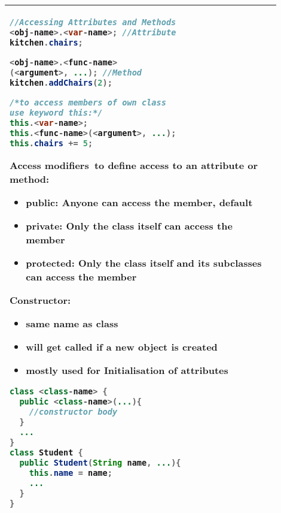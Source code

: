 \documentclass[a4paper, 8pt]{extarticle}
\begin{document}
\begin{minipage}[t]{0.25\linewidth}
\begin{tabular}{|p{0.9\linewidth}|}
\begin{lstlisting}[language=Java, aboveskip=0pt,belowskip=-6pt]
//Accessing Attributes and Methods
<obj-name>.<var-name>; //Attribute
kitchen.chairs;

<obj-name>.<func-name>
(<argument>, ...); //Method
kitchen.addChairs(2);

/*to access members of own class 
use keyword this:*/
this.<var-name>;
this.<func-name>(<argument>, ...);
this.chairs += 5;

\end{lstlisting}
\vspace{7pt}
\fontsize{8}{5}\selectfont
\begin{minipage}[l]{1\linewidth}
\vspace{7pt}
Access modifiers\small \ to define access to an attribute
or method:\begin{itemize}
\setlength{\itemindent}{-17pt}
\item public: Anyone can access the member, default
\item private: Only the class itself can access the member
\item protected: Only the class itself and its subclasses can access the member
\end{itemize}
\vspace{2pt}
\end{minipage}
\begin{minipage}[l]{1\linewidth}
\vspace{7pt}
Constructor:\small
\begin{itemize}
\setlength{\itemindent}{-20pt}
\item[] same name as class
\item[] will get called if a new object is created
\item[] mostly used for Initialisation of attributes
\end{itemize}
\vspace{2pt}
\end{minipage}
\begin{lstlisting}[language=Java, aboveskip=0pt,belowskip=-2pt]
class <class-name> {
  public <class-name>(...){
    //constructor body
  }
  ...
}
class Student {
  public Student(String name, ...){
    this.name = name;
    ...
  }
}
\end{lstlisting}
\\\hline
\end{tabular}
\end{minipage}
\end{document}
